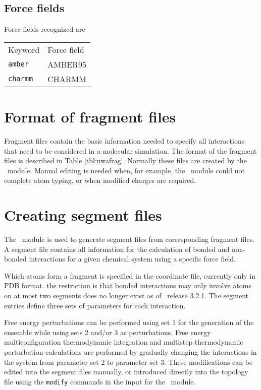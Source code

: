 \subsection{Force fields}
\label{sec:nwaforcefields}
Force fields recognized are
\begin{center}
\begin{tabular}{ll}
\hline
Keyword      & Force field   \\
{\tt amber}  & AMBER95       \\
{\tt charmm} & CHARMM        \\
\hline
\end{tabular}
\end{center}  

\section{Format of fragment files}
Fragment files contain the basic information needed to specify all
interactions that need to be considered in a molecular simulation.
The format of the fragment files is described in Table \ref{tbl:nwafrag}.
Normally these files are created by the \prepare\ module. Manual
editing is needed when, for example, the \prepare\ module could not
complete atom typing, or when modified charges are required.

\section{Creating segment files}
\label{sec:nwanwsgm}
The \prepare\ module is used to generate segment files 
from corresponding fragment files. A segment file contains all
information for the calculation of bonded and non-bonded interactions
for a given chemical system using a specific force field.

Which atoms form a fragment is specified in the coordinate file,
currently only in PDB format.
the restriction is that bonded interactions may only involve atoms on at
most two segments does no longer exist as of \nwchem\ release 3.2.1. 
The segment entries define three sets of parameters
for each interaction. 

Free energy perturbations can be performed using set 1 for the 
generation of the ensemble while using sets 2 and/or 3
as perturbations. Free energy multiconfiguration thermodynamic
integration and multistep thermodynamic perturbation calculations are
performed by gradually changing the interactions in the system from
parameter set 2 to parameter set 3. These modifications can be 
edited into the segment files manually, or introduced directly into
the topology file using the \verb+modify+ commands in the input for
the \prepare\ module.


